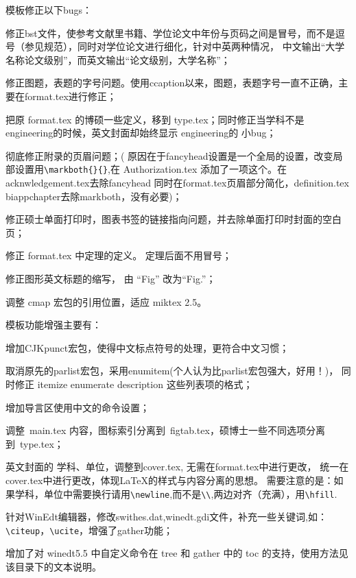 模板修正以下bugs：
\begin{hitlist}
  \item 修正bst文件，使参考文献里书籍、学位论文中年份与页码之间是冒号，而不是逗号（参见规范），同时对学位论文进行细化，针对中英两种情况，
中文输出``大学名称论文级别''，而英文输出``论文级别，大学名称''；
  \item 修正图题，表题的字号问题。使用ccaption以来，图题，表题字号一直不正确，主要在format.tex进行修正；
  \item 把原 format.tex 的博硕一些定义，移到 type.tex；同时修正当学科不是engineering的时候，英文封面却始终显示 engineering的 小bug；
  \item 彻底修正附录的页眉问题；( 原因在于fancyhead设置是一个全局的设置，改变局部设置用\verb|\markboth{}{}|,在 Authorization.tex 添加了一项这个。在acknwledgement.tex去除fancyhead
  同时在format.tex页眉部分简化，definition.tex biappchapter去除markboth，没有必要)；
  \item 修正硕士单面打印时，图表书签的链接指向问题，并去除单面打印时封面的空白页；
  \item 修正 format.tex 中定理的定义。 定理后面不用冒号；
  \item 修正图形英文标题的缩写， 由 ``Fig'' 改为``Fig.''；
  \item 调整 cmap 宏包的引用位置，适应 miktex 2.5。
\end{hitlist}

模板功能增强主要有：
\begin{hitlist}
  \item 增加CJKpunct宏包，使得中文标点符号的处理，更符合中文习惯；
  \item 取消原先的parlist宏包，采用enumitem(个人认为比parlist宏包强大，好用！)，
         同时修正 itemize enumerate description 这些列表项的格式；
  \item 增加导言区使用中文的命令设置；
  \item 调整~main.tex 内容，图标索引分离到~figtab.tex，硕博士一些不同选项分离到~type.tex；
  \item 英文封面的 学科、单位，调整到cover.tex, 无需在format.tex中进行更改， 统一在cover.tex中进行更改，体现LaTeX的样式与内容分离的思想。
   需要注意的是：如果学科，单位中需要换行请用\verb|\newline|,而不是\verb|\\|,两边对齐（充满），用\verb|\hfill|.
  \item 针对WinEdt编辑器，修改swithes.dat,winedt.gdi文件，补充一些关键词,如：\verb|\citeup|，\verb|\ucite|，增强了gather功能；
  \item 增加了对 winedt5.5 中自定义命令在 tree 和 gather 中的 toc 的支持，使用方法见该目录下的文本说明。
\end{hitlist}

